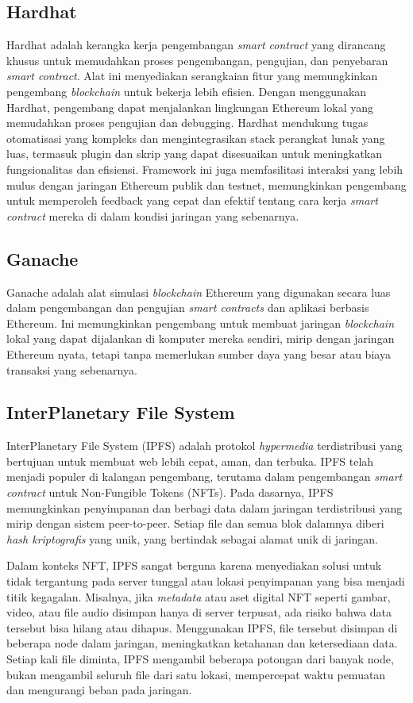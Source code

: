 \subsection{Hardhat}
Hardhat adalah kerangka kerja pengembangan \emph{smart contract} yang dirancang khusus untuk memudahkan proses pengembangan, pengujian, dan penyebaran \emph{smart contract}. Alat ini menyediakan serangkaian fitur yang memungkinkan pengembang \emph{blockchain} untuk bekerja lebih efisien. Dengan menggunakan Hardhat, pengembang dapat menjalankan lingkungan Ethereum lokal yang memudahkan proses pengujian dan debugging. Hardhat mendukung tugas otomatisasi yang kompleks dan mengintegrasikan stack perangkat lunak yang luas, termasuk plugin dan skrip yang dapat disesuaikan untuk meningkatkan fungsionalitas dan efisiensi. Framework ini juga memfasilitasi interaksi yang lebih mulus dengan jaringan Ethereum publik dan testnet, memungkinkan pengembang untuk memperoleh feedback yang cepat dan efektif tentang cara kerja \emph{smart contract} mereka di dalam kondisi jaringan yang sebenarnya.

\subsection{Ganache}

Ganache adalah alat simulasi \emph{blockchain} Ethereum yang digunakan secara luas dalam pengembangan dan pengujian \emph{smart contracts} dan aplikasi berbasis Ethereum. Ini memungkinkan pengembang untuk membuat jaringan \emph{blockchain} lokal yang dapat dijalankan di komputer mereka sendiri, mirip dengan jaringan Ethereum nyata, tetapi tanpa memerlukan sumber daya yang besar atau biaya transaksi yang sebenarnya.

\subsection{InterPlanetary File System}
InterPlanetary File System (IPFS) adalah protokol \emph{hypermedia} terdistribusi yang bertujuan untuk membuat web lebih cepat, aman, dan terbuka. IPFS telah menjadi populer di kalangan pengembang, terutama dalam pengembangan \emph{smart contract} untuk Non-Fungible Tokens (NFTs). Pada dasarnya, IPFS memungkinkan penyimpanan dan berbagi data dalam jaringan terdistribusi yang mirip dengan sistem peer-to-peer. Setiap file dan semua blok dalamnya diberi \emph{hash kriptografis} yang unik, yang bertindak sebagai alamat unik di jaringan.

Dalam konteks NFT, IPFS sangat berguna karena menyediakan solusi untuk tidak tergantung pada server tunggal atau lokasi penyimpanan yang bisa menjadi titik kegagalan. Misalnya, jika \emph{metadata} atau aset digital NFT seperti gambar, video, atau file audio disimpan hanya di server terpusat, ada risiko bahwa data tersebut bisa hilang atau dihapus. Menggunakan IPFS, file tersebut disimpan di beberapa node dalam jaringan, meningkatkan ketahanan dan ketersediaan data. Setiap kali file diminta, IPFS mengambil beberapa potongan dari banyak node, bukan mengambil seluruh file dari satu lokasi, mempercepat waktu pemuatan dan mengurangi beban pada jaringan.

